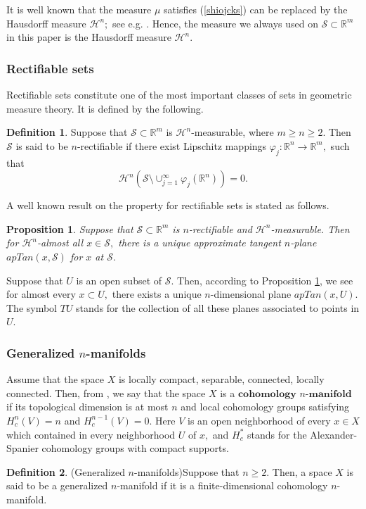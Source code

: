 \documentclass[11pt,twoside]{article}
\newtheorem{prop}[thm]{Proposition}
\theoremstyle{definition}
\newtheorem{defn}{Definition}[section]
\theoremstyle{remark}
\begin{document}
It is well known that the measure $\mu$ satisfies (\ref{shiojcks}) can be replaced by the Hausdorff measure $\mathcal{H}^{n};$ see e.g. \cite[Lemma C.3]{Sem96}. Hence, the measure we always used on $\mathcal{S}\subset \mathbb{R}^{m}$ in this paper is 
the Hausdorff measure $\mathcal{H}^{n}.$
\subsubsection{Rectifiable sets}
Rectifiable sets constitute one of the most important classes of sets in geometric measure theory. It is defined by the following. 
\begin{defn}{\rm\cite{Fed69}}
Suppose that $\mathcal{S}\subset \mathbb{R}^{m}$ is $\mathcal{H}^{n}$-measurable, where $m\geq n\geq2.$ Then $\mathcal{S}$ is said to be $n$-rectifiable if there exist Lipschitz mappings $\varphi_{j}:
\mathbb{R}^{n}\rightarrow\mathbb{R}^{m},$ such that 
$$\mathcal{H}^{n}(\mathcal{S}\setminus\cup_{j=1}^{\infty}\varphi_{j}(\mathbb{R}^{n}))=0.$$
\end{defn}
A well known result on the property for rectifiable sets is stated as follows.
\begin{prop}{\rm\cite[Theorem 15.19]{Mat95}}\label{sfbgdnbd}
Suppose that $\mathcal{S}\subset \mathbb{R}^{m}$ is $n$-rectifiable and $\mathcal{H}^{n}$-measurable. Then for $\mathcal{H}^{n}$-almost all $x\in\mathcal{S},$ there is a unique approximate tangent 
$n$-plane $apTan(x,\mathcal{S})$ for $x$ at $\mathcal{S}.$
\end{prop}
Suppose that $U$ is an open subset of $\mathcal{S}.$ Then, according to Proposition \ref{sfbgdnbd}, we see for almost every $x\subset U,$ there exists a unique $n$-dimensional plane  $apTan(x,U).$
The symbol $TU$ stands for the collection of all these planes associated to points in $U.$  

\subsubsection{Generalized $n$-manifolds}
Assume that the space $X$ is locally compact, separable, connected,  locally connected. Then, from \cite[Definition 1.1]{HS02}, we say that the space $X$ is a $\mathbf{cohomology}$ $n$-$\mathbf{manifold}$ if its topological dimension is at most $n$ and 
 local cohomology groups satisfying $H_{c}^{n}(V)=n$ and  $H_{c}^{n-1}(V)=0.$ Here $V$ is an open neighborhood of every $x\in X$ which contained in every neighborhood $U$ of $x,$ and $H_{c}^{*}$ stands for the Alexander-Spanier cohomology groups with compact supports.
\begin{defn}\cite[Definition 1.6]{HS02}(Generalized $n$-manifolds)\label{ajojlaxax}
Suppose that  $n\geq2.$ Then, a space $X$ is said to be a generalized $n$-manifold if it is a finite-dimensional cohomology $n$-manifold.
\end{defn}
 
\end{document}
